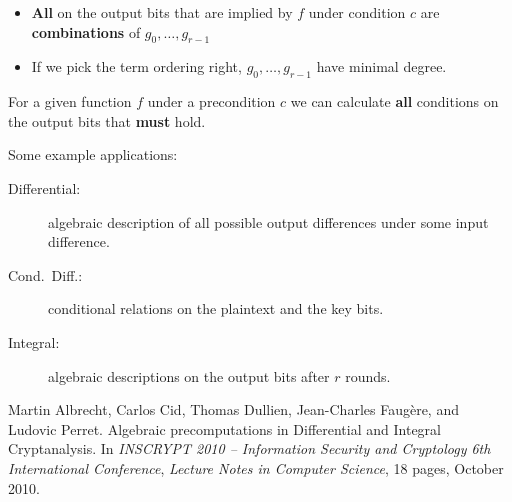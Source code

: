 \documentclass[9pt]{beamer}
\begin{document}
\begin{frame}[allowframebreaks]
\framebreak

\begin{itemize}
\item \textbf{All} on the output bits that are implied by \(f\) under condition \(c\) are \textbf{combinations} of \(g_0, \dots, g_{r-1}\)
\item If we pick the term ordering right, $g_0,\dots,g_{r-1}$ have minimal degree.
\end{itemize}           
\begin{block}{}
For a given function \(f\) under a precondition \(c\) we can calculate \textbf{all}  conditions on the output bits that \textbf{must} hold.
\end{block}


\framebreak

Some example applications:      
\begin{description}
\item[Differential:] algebraic description of all possible output differences under some input difference.
\item[Cond.\ Diff.:]conditional relations on the plaintext and the key bits.
\item[Integral:] algebraic descriptions on the output bits after $r$ rounds.
\end{description}

\begin{small}
\begin{thebibliography}{inscrypt2010}
Martin Albrecht, Carlos Cid, Thomas Dullien, Jean-Charles Faugère, and Ludovic
  Perret.
\newblock Algebraic precomputations in Differential and Integral Cryptanalysis.
\newblock In {\em INSCRYPT 2010 -- {I}nformation {S}ecurity and {C}ryptology
  6th International Conference}, {\em Lecture Notes in Computer Science}, 18
  pages, October 2010.
\end{thebibliography}
 \end{small}

\end{frame}
\end{document}

